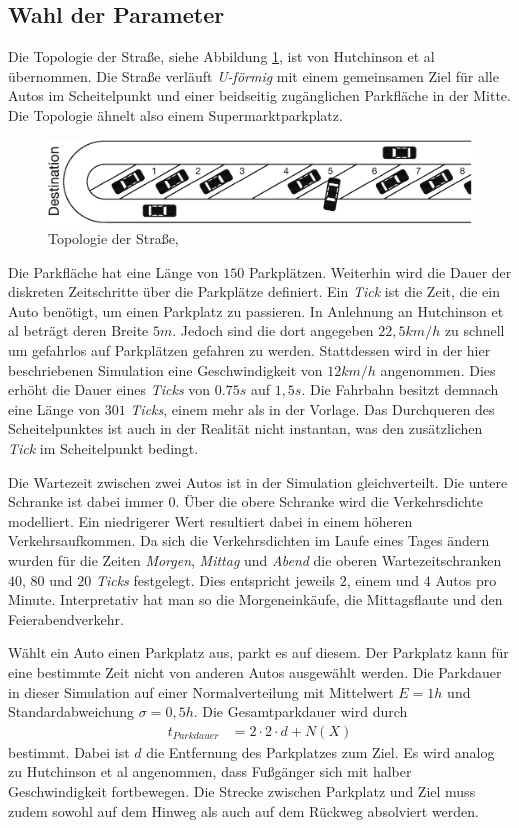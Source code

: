 \subsection{Wahl der Parameter}
Die Topologie der Straße, siehe Abbildung \ref{fig_street}, ist von Hutchinson et al übernommen. Die Straße verläuft \emph{U-förmig} mit einem gemeinsamen Ziel für alle Autos im Scheitelpunkt und einer beidseitig zugänglichen Parkfläche in der Mitte. Die Topologie ähnelt also einem Supermarktparkplatz. 
\begin{figure}
\includegraphics[width=\textwidth]{pics/street.png}
\caption{Topologie der Straße, \cite[Fig. 18-1]{hutchinson}}\label{fig_street}
\end{figure}
 Die Parkfläche hat eine Länge von $150$ Parkplätzen. Weiterhin wird die Dauer der diskreten Zeitschritte über die Parkplätze definiert. Ein \emph{Tick} ist die Zeit, die ein Auto benötigt, um einen Parkplatz zu passieren. 
In Anlehnung an Hutchinson et al \cite[Modeling the Interactions of Parking Strategies, S. 4f]{hutchinson} beträgt deren Breite $5m$. Jedoch sind die dort angegeben $22,5 km/h$ zu schnell um gefahrlos auf Parkplätzen gefahren zu werden. Stattdessen wird in der hier beschriebenen Simulation eine Geschwindigkeit von $12km/h$ angenommen. Dies erhöht die Dauer eines \emph{Ticks} von $0.75s$ auf $1,5s$. Die Fahrbahn besitzt demnach eine Länge von $301$ \emph{Ticks}, einem mehr als in der Vorlage. Das Durchqueren des Scheitelpunktes ist auch in der Realität nicht instantan, was den zusätzlichen \emph{Tick} im Scheitelpunkt bedingt. 

Die Wartezeit zwischen zwei Autos ist in der Simulation gleichverteilt. Die untere Schranke ist dabei immer $0$. Über die obere Schranke wird die Verkehrsdichte modelliert. Ein niedrigerer Wert resultiert dabei in einem höheren Verkehrsaufkommen. Da sich die Verkehrsdichten im Laufe eines Tages ändern wurden für die Zeiten \emph{Morgen}, \emph{Mittag} und \emph{Abend} die oberen Wartezeitschranken $40$, $80$ und $20$ \emph{Ticks} festgelegt. Dies entspricht jeweils $2$, einem und $4$ Autos pro Minute. Interpretativ hat man so die Morgeneinkäufe, die Mittagsflaute und den Feierabendverkehr. 

Wählt ein Auto einen Parkplatz aus, parkt es auf diesem. Der Parkplatz kann für eine bestimmte Zeit nicht von anderen Autos ausgewählt werden. Die Parkdauer in dieser Simulation auf einer Normalverteilung mit Mittelwert $E=1h$ und Standardabweichung $\sigma = 0,5h$. Die Gesamtparkdauer wird durch 
\begin{align}
t_{Parkdauer} &= 2\cdot 2\cdot d + N(X)
\end{align}
bestimmt. Dabei ist $d$ die Entfernung des Parkplatzes zum Ziel. Es wird analog zu Hutchinson et al angenommen, dass Fußgänger sich mit halber Geschwindigkeit fortbewegen. Die Strecke zwischen Parkplatz und Ziel muss zudem sowohl auf dem Hinweg als auch auf dem Rückweg absolviert werden.

